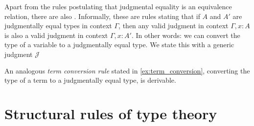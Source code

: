 Apart from the rules postulating that judgmental equality is an equivalence relation, there are also .
Informally, these are rules stating that if $A$ and $A'$ are judgmentally equal types in context $\Gamma$, then any valid judgment in context $\Gamma,x:A$ is also a valid judgment in context $\Gamma,x:A'$. In other words: we can convert the type of a variable to a judgmentally equal type. We state this with a generic judgment $\mathcal{J}$
\begin{prooftree}
\end{prooftree}
An analogous \emph{term conversion rule} stated in \cref{ex:term_conversion}, converting the type of a term to a judgmentally equal type, is derivable.


\section{Structural rules of type theory}

